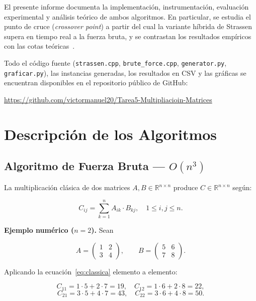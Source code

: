 \documentclass[12pt,a4paper]{article}
\begin{document}
El presente informe documenta la implementaci\'on, instrumentaci\'on, evaluaci\'on
experimental y an\'alisis te\'orico de ambos algoritmos. En particular, se estudia
el punto de cruce (\emph{crossover point}) a partir del cual la variante
h\'ibrida de Strassen supera en tiempo real a la fuerza bruta, y se contrastan
los resultados emp\'iricos con las cotas te\'oricas~\cite{skiena2020algorithm}.

Todo el c\'odigo fuente (\texttt{strassen.cpp}, \texttt{brute\_force.cpp},
\texttt{generator.py}, \texttt{graficar.py}), las instancias generadas,
los resultados en CSV y las gr\'aficas se encuentran disponibles en el
repositorio p\'ublico de GitHub:

\begin{center}
\url{https://github.com/victormanuel20/Tarea5-Multipliacioin-Matrices}
\end{center}

\section{Descripci\'on de los Algoritmos}

\subsection{Algoritmo de Fuerza Bruta --- $O(n^3)$}

La multiplicaci\'on cl\'asica de dos matrices $A, B \in \mathbb{R}^{n \times n}$
produce $C \in \mathbb{R}^{n \times n}$ seg\'un:

\begin{equation}
    C_{ij} = \sum_{k=1}^{n} A_{ik} \cdot B_{kj}, \quad 1 \le i, j \le n.
    \label{eq:classica}
\end{equation}

\noindent\textbf{Ejemplo num\'erico ($n = 2$).} Sean

\[
A = \begin{pmatrix} 1 & 2 \\ 3 & 4 \end{pmatrix}, \qquad
B = \begin{pmatrix} 5 & 6 \\ 7 & 8 \end{pmatrix}.
\]

Aplicando la ecuaci\'on~\eqref{eq:classica} elemento a elemento:

\[
C_{11} = 1{\cdot}5 + 2{\cdot}7 = 19, \quad
C_{12} = 1{\cdot}6 + 2{\cdot}8 = 22,
\]
\[
C_{21} = 3{\cdot}5 + 4{\cdot}7 = 43, \quad
C_{22} = 3{\cdot}6 + 4{\cdot}8 = 50.
\]
\end{document}
